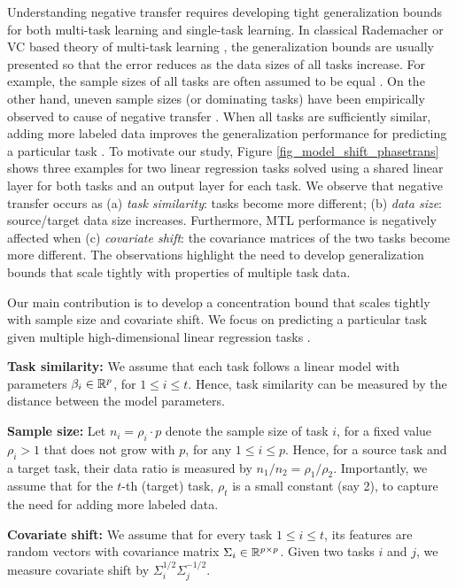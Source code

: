 Understanding negative transfer requires developing tight generalization bounds for both multi-task learning and single-task learning.
In classical Rademacher or VC based theory of multi-task learning \cite{B00,AZ05,M06}, the generalization bounds are usually presented so that the error reduces as the data sizes of all tasks increase.
For example, the sample sizes of all tasks are often assumed to be equal \cite{B00,LPTV09,LPVT11,MPR16}.
On the other hand, uneven sample sizes (or dominating tasks) have been empirically observed to cause of negative transfer \cite{YKGLHF20}.
When all tasks are sufficiently similar, adding more labeled data improves the generalization performance for predicting a particular task \cite{WZR20}.
To motivate our study, Figure \ref{fig_model_shift_phasetrans} shows three examples for two linear regression tasks solved using a shared linear layer for both tasks and an output layer for each task.
We observe that negative transfer occurs as (a) \textit{task similarity}: tasks become more different; (b) \textit{data size}: source/target data size increases.
Furthermore, MTL performance is negatively affected when (c) \textit{covariate shift}: the covariance matrices of the two tasks become more different.
The observations highlight the need to develop generalization bounds that scale tightly with properties of multiple task data.

Our main contribution is to develop a concentration bound that scales tightly with sample size and covariate shift.
We focus on predicting a particular task given multiple high-dimensional linear regression tasks \cite{HMRT19,BLLT20}.
\squishlist
	\item \textbf{Task similarity:} We assume that each task follows a linear model with parameters $\beta_i\in\mathbb{R}^p$, for $1\le i\le t$.
	Hence, task similarity can be measured by the distance between the model parameters.
	\item \textbf{Sample size:} Let $n_i = \rho_i \cdot p$ denote the sample size of task $i$, for a fixed value $\rho_i > 1$ that does not grow with $p$, for any $1\le i\le p$.
	Hence, for a source task and a target task, their data ratio is measured by $n_1 / n_2 = \rho_1 / \rho_2$.
	Importantly, we assume that for the $t$-th (target) task, $\rho_t$ is a small constant (say 2), to capture the need for adding more labeled data.
	\item \textbf{Covariate shift:} We assume that for every task $1\le i\le t$, its features are random vectors with covariance matrix $\Sigma_i\in\mathbb{R}^{p\times p}$.
	Given two tasks $i$ and $j$, we measure covariate shift by $\Sigma_i^{1/2}\Sigma_j^{-1/2}$.
\squishend

